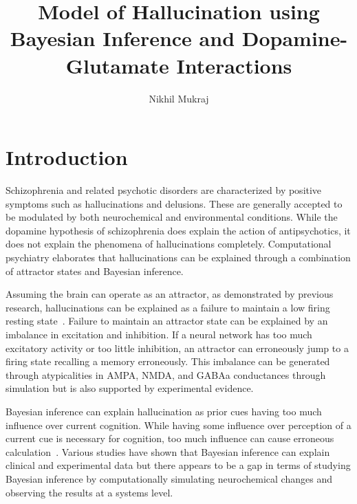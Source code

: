 \documentclass[twocolumn]{article}
\title{Model of Hallucination using Bayesian Inference and Dopamine-Glutamate Interactions}
\author{Nikhil Mukraj}
\date{}
\begin{document}

\raggedbottom{}
\section{Introduction}

Schizophrenia and related psychotic disorders are characterized by positive symptoms such as hallucinations and delusions. 
These are generally accepted to be modulated by both neurochemical and environmental conditions. 
While the dopamine hypothesis of schizophrenia does explain the action of antipsychotics, it does not explain the phenomena of hallucinations completely. Computational psychiatry elaborates that hallucinations can be explained through a combination of attractor states and Bayesian inference.

Assuming the brain can operate as an attractor, as demonstrated by previous research, hallucinations can be explained as a failure to maintain a low firing resting state~\cite{rolls2012ocd-schizophrenia, rolls2024cortical, renno-costa2014hippocampus-ca3}. 
Failure to maintain an attractor state can be explained by an imbalance in excitation and inhibition. 
If a neural network has too much excitatory activity or too little inhibition, an attractor can erroneously jump to a firing state recalling a memory erroneously. This imbalance can be generated through atypicalities in AMPA, NMDA, and GABAa conductances through simulation but is also supported by experimental evidence.

Bayesian inference can explain hallucination as prior cues having too much influence over current cognition. While having some influence over perception of a current cue is necessary for cognition, too much influence can cause erroneous calculation~\cite{siemerkus2019bayesian}. Various studies have shown that Bayesian inference can explain clinical and experimental data but there appears to be a gap in terms of studying Bayesian inference by computationally simulating neurochemical changes and observing the results at a systems level.
\end{document}
